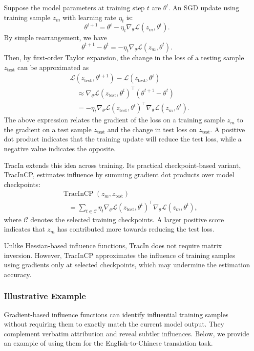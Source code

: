 Suppose the model parameters at training step $t$ are $\theta^t$. An SGD update using training sample $z_m$ with learning rate $\eta_t$ is:
\[
\theta^{t+1}
=
\theta^t-\eta_t\nabla_\theta\mathcal{L}(z_m,\theta^t).
\]
By simple rearrangement, we have
\[
\theta^{t+1} - \theta^t
=-\eta_t\nabla_\theta\mathcal{L}(z_m,\theta^t).
\]
Then, by first-order Taylor expansion, the change in the loss of a testing sample $z_{\text{test}}$ can be approximated as
\[
\begin{aligned}
&\mathcal{L}(z_{\text{test}},\theta^{t+1})
-\mathcal{L}(z_{\text{test}},\theta^t)\\
&\quad\approx
\nabla_\theta\mathcal{L}(z_{\text{test}},\theta^t)^\top
(\theta^{t+1}-\theta^t)\\
&\quad=
-\eta_t
\nabla_\theta\mathcal{L}(z_{\text{test}},\theta^t)^\top
\nabla_\theta\mathcal{L}(z_m,\theta^t).
\end{aligned}
\]
The above expression relates the gradient of the loss on a training sample $z_m$ to the gradient on a test sample $z_{\text{test}}$ and the change in test loss on $z_{\text{test}}$. A positive dot product indicates that the training update will reduce the test loss, while a negative value indicates the opposite.

TracIn extends this idea across training. Its practical checkpoint-based variant, TracInCP, estimates influence by summing gradient dot products over model checkpoints:
\[
\begin{aligned}
&\operatorname{TracInCP}(z_m,z_{\text{test}})\\
&\quad=
\sum_{t\in\mathcal{C}}\eta_t
\nabla_\theta\mathcal{L}(z_{\text{test}},\theta^t)^\top
\nabla_\theta\mathcal{L}(z_m,\theta^t),
\end{aligned}
\]
where $\mathcal{C}$ denotes the selected training checkpoints. A larger positive score indicates that $z_m$ has contributed more towards reducing the test loss.

Unlike Hessian-based influence functions, TracIn does not require matrix inversion. However, TracInCP approximates the influence of training samples using gradients only at selected checkpoints, which may undermine the estimation accuracy.

\subsubsection{Illustrative Example}

Gradient-based influence functions can identify influential training samples without requiring them to exactly match the current model output. They complement verbatim attribution and reveal subtler influences. Below, we provide an example of using them for the English-to-Chinese translation task.

